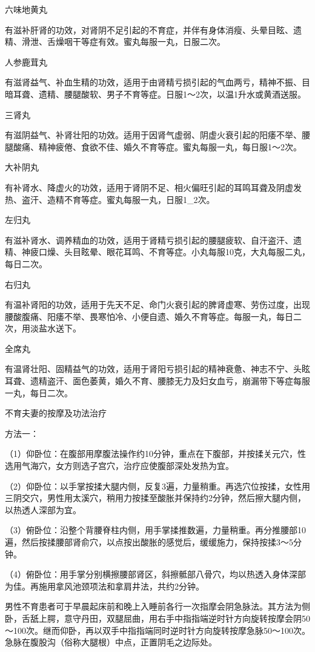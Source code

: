 \documentclass[12pt,UTF8]{ctexbook}
\begin{document}
六味地黄丸

有滋补肝肾的功效，对肾阴不足引起的不育症，并伴有身体消瘦、头晕目眩、遗精、滑泄、舌燥咽干等症有效。蜜丸每服一丸，日服二次。

人参鹿茸丸

有滋肾益气、补血生精的功效，适用于由肾精亏损引起的气血两亏，精神不振、目暗耳聋、遗精、腰腿酸软、男子不育等症。日服1～2次，以温1升水或黄酒送服。

三肾丸

有滋阴益气、补肾壮阳的功效。适用于因肾气虚弱、阴虚火衰引起的阳痿不举、腰腿酸痛、精神疲倦、食欲不佳、婚久不育等症。蜜丸每服一丸，每日服1～2次。

大补阴丸

有补肾水、降虚火的功效，适用于肾阴不足、相火偏旺引起的耳鸣耳聋及阴虚发热、盗汗、造精不育等症。蜜丸每服一丸，日服1_2次。

左归丸

有滋补肾水、调养精血的功效，适用于肾精亏损引起的腰腿疲软、自汗盗汗、遗精、神疲口燥、头目眩晕、眼花耳鸣、不育等症。小丸每服10克，大丸每服二丸，每日二次。

右归丸

有温补肾阳的功效，适用于先天不足、命门火衰引起的脾肾虚寒、劳伤过度，出现腰酸腹痛、阳痿不举、畏寒怕冷、小便自遗、婚久不育等症。每服一丸，每日二次，用淡盐水送下。

全席丸

有温肾壮阳、固精益气的功效，适用于肾阳亏损引起的精神衰惫、神志不宁、头眩耳聋、遗精盗汗、面色萎黄，婚久不育、腰膝无力及妇女血亏，崩漏带下等症每服一丸，每日二次。





不育夫妻的按摩及功法治疗


方法一：

（1）仰卧位：在腹部用摩腹法操作约10分钟，重点在下腹部，并按揉关元穴，性选用气海穴，女方则选子宫穴，治疗应使腹部深处发热为宜。

（2）仰卧位：以手掌按揉大腿内侧，反复3遍，力量稍重。再选穴位按揉，女性用三阴交穴，男性用太溪穴，稍用力按揉至酸胀并保持约2分钟，然后擦大腿内侧，以热透人深部为宜。

（3）俯卧位：沿整个背腰脊柱内侧，用手掌揉推数遍，力量稍重。再分推腰部10遍，然后按揉腰部肾俞穴，以点按出酸胀的感觉后，缓缓施力，保持按揉3～5分钟。

（4）俯卧位：用手掌分别横擦腰部肾区，斜擦骶部八骨穴，均以热透入身体深部为佳。再施用拿风池颈项法和拿肩井法，共约2分钟。

男性不育患者可于早晨起床前和晚上入睡前各行一次指摩会阴急脉法。其方法为侧卧，舌舐上腭，意守丹田，双腿屈曲，用右手中指指端逆时针方向旋转按摩会阴50～100次。继而仰卧，再以双手中指指端同时逆时针方向旋转按摩急脉50～100次。急脉在腹股沟（俗称大腿根）中点，正置阴毛之边际处。
\end{document}
